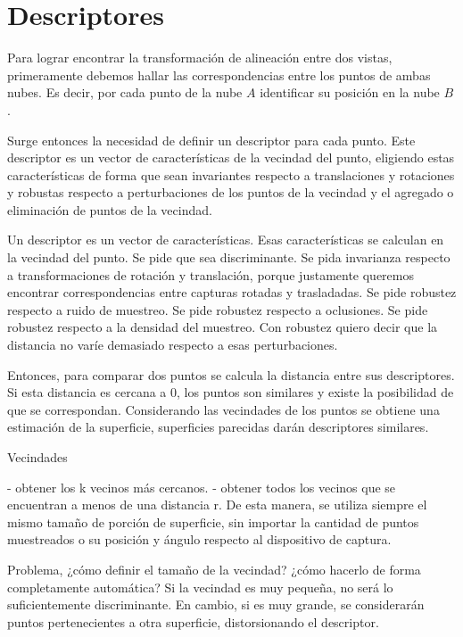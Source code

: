 \section{Descriptores}
Para lograr encontrar la transformación de alineación entre dos vistas,
primeramente debemos hallar las correspondencias entre los puntos de ambas nubes.
Es decir, por cada punto de la nube $A$ identificar su posición en la nube $B$.

Surge entonces la necesidad de definir un descriptor para cada punto.  Este
descriptor es un vector de características de la vecindad del punto, eligiendo
estas características de forma que sean invariantes respecto a translaciones y
rotaciones y robustas respecto a perturbaciones de los puntos de la vecindad y
el agregado o eliminación de puntos de la vecindad.

Un descriptor es un vector de características.
Esas características se calculan en la vecindad del punto.
Se pide que sea discriminante.
Se pida invarianza respecto a transformaciones de rotación y translación, porque justamente queremos encontrar correspondencias entre capturas rotadas y trasladadas.
Se pide robustez respecto a ruido de muestreo.
Se pide robustez respecto a oclusiones.
Se pide robustez respecto a la densidad del muestreo.
Con robustez quiero decir que la distancia no varíe demasiado respecto a esas perturbaciones.


Entonces, para comparar dos puntos se calcula la distancia entre sus descriptores.
Si esta distancia es cercana a $0$, los puntos son similares y existe la
posibilidad de que se correspondan.
Considerando las vecindades de los puntos se obtiene una estimación de la superficie,
superficies parecidas darán descriptores similares.


Vecindades

- obtener los k vecinos más cercanos. 
- obtener todos los vecinos que se encuentran a menos de una distancia r.
 De esta manera, se utiliza siempre el mismo tamaño de porción de
superficie, sin importar la cantidad de puntos muestreados o su posición y
ángulo respecto al dispositivo de captura.

Problema, ¿cómo definir el tamaño de la vecindad? ¿cómo hacerlo de forma completamente automática?
Si la vecindad es muy pequeña, no será lo suficientemente discriminante.
En cambio, si es muy grande, se considerarán puntos pertenecientes a otra superficie, distorsionando el descriptor.


